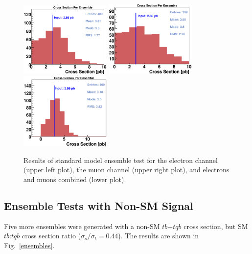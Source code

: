 \vspace{0.1in}
\begin{figure}[!h!tbp]
\includegraphics[width=0.40\textwidth]
{eps/MatrixElement/ensembles/Ensembles_Electron}
\includegraphics[width=0.40\textwidth]
{eps/MatrixElement/ensembles/Ensembles_Muon}
\includegraphics[width=0.40\textwidth]
{eps/MatrixElement/ensembles/Ensembles}
\vspace{-0.1in}
\caption[SMens]{Results of standard model ensemble test for the
electron channel (upper left plot), the muon channel (upper right
plot), and electrons and muons combined (lower plot).}
\label{SMens}
\end{figure}

\clearpage

\subsection{Ensemble Tests with Non-SM Signal}
\label{ens_nonSM_sig}

Five more ensembles were generated with a non-SM $tb$+$tqb$ cross
section, but SM $tb$:$tqb$ cross section ratio ($\sigma_s/\sigma_t =
0.44$). The results are shown in Fig.~\ref{ensembles}.

